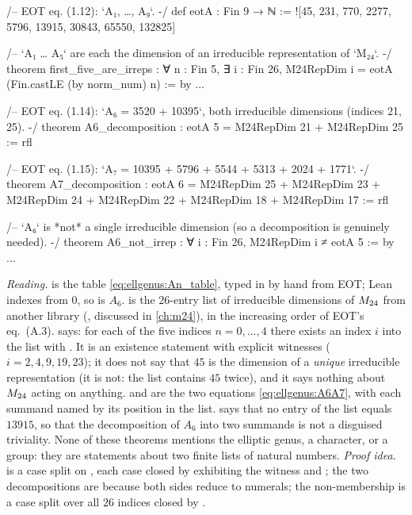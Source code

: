 \begin{leanbox}
\begin{leancode}
/-- EOT eq. (1.12): `A₁, …, A₉`. -/
def eotA : Fin 9 → ℕ := ![45, 231, 770, 2277, 5796, 13915, 30843, 65550, 132825]

/-- `A₁ … A₅` are each the dimension of an irreducible representation
    of `M₂₄`. -/
theorem first_five_are_irreps :
    ∀ n : Fin 5, ∃ i : Fin 26,
      M24RepDim i = eotA (Fin.castLE (by norm_num) n) := by ...

/-- EOT eq. (1.14): `A₆ = 3520 + 10395`, both irreducible dimensions
    (indices 21, 25). -/
theorem A6_decomposition :
    eotA 5 = M24RepDim 21 + M24RepDim 25 := rfl

/-- EOT eq. (1.15): `A₇ = 10395 + 5796 + 5544 + 5313 + 2024 + 1771`. -/
theorem A7_decomposition :
    eotA 6 = M24RepDim 25 + M24RepDim 23 + M24RepDim 24 + M24RepDim 22 +
      M24RepDim 18 + M24RepDim 17 := rfl

/-- `A₆` is *not* a single irreducible dimension (so a decomposition is
    genuinely needed). -/
theorem A6_not_irrep : ∀ i : Fin 26, M24RepDim i ≠ eotA 5 := by ...
\end{leancode}
\emph{Reading.}  is the table \eqref{eq:ellgenus:An_table}, typed in by hand
from EOT; Lean indexes from $0$, so  is $A_6$.  is the
$26$-entry list of irreducible dimensions of $M_{24}$ from another library
(, discussed in
\cref{ch:m24}), in the increasing order of EOT's eq.~(A.3). 
says: for each of the five indices $n=0,\dots,4$ there exists an index $i$ into the list with
. It is an existence statement with explicit witnesses
($i=2,4,9,19,23$); it does not say that $45$ is the dimension of a \emph{unique} irreducible
representation (it is not: the list contains $45$ twice), and it says nothing about $M_{24}$
acting on anything.  and  are the two
equations \eqref{eq:ellgenus:A6A7}, with each summand named by its position in the list.
 says that no entry of the list equals $13915$, so that the
decomposition of $A_6$ into two summands is not a disguised triviality. None of these
theorems mentions the elliptic genus, a character, or a group: they are statements about two
finite lists of natural numbers. \emph{Proof idea.}  is a
case split on , each case closed by exhibiting the witness and ;
the two decompositions are  because both sides reduce to numerals; the
non-membership is a case split over all $26$ indices closed by .
\end{leanbox}

